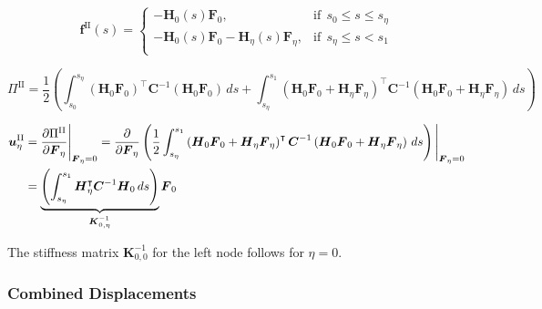 \begin{equation}
\boldsymbol{f}^{\mathrm{II}}(s) = \begin{cases}
-\boldsymbol{H}_{0}(s)\boldsymbol{F}_0, & \text{if}\ \ s_0 \le s \le s_\eta \\
-\boldsymbol{H}_{0}(s)\boldsymbol{F}_0 - \boldsymbol{H}_{\eta}(s)\boldsymbol{F}_\eta, & \text{if}\ \ s_\eta \le s < s_1 \\
\end{cases}
\end{equation}

\begin{equation}
\Pi^{\mathrm{II}} = \frac{1}{2}\left(\int_{s_0}^{s_\eta} \left(\boldsymbol{H}_{0}\boldsymbol{F}_0\right)^\intercal\boldsymbol{C}^{-1}\left(\boldsymbol{H}_{0}\boldsymbol{F}_0\right)\,ds + \int_{s_\eta}^{s_1} \left(\boldsymbol{H}_{0}\boldsymbol{F}_0 + \boldsymbol{H}_{\eta}\boldsymbol{F}_\eta\right)^\intercal\boldsymbol{C}^{-1}\left(\boldsymbol{H}_{0}\boldsymbol{F}_0 + \boldsymbol{H}_{\eta}\boldsymbol{F}_\eta\right)\,ds\right)
\end{equation}

\begin{align}
\boldsymbol{u}^{\mathrm{II}}_\eta &= \frac{\partial \Pi^{\mathrm{II}}}{\partial \boldsymbol{F}_\eta}\Bigg|_{\boldsymbol{F}_\eta = 0} = \frac{\partial}{\partial \boldsymbol{F}_\eta}\left(\frac{1}{2}\int_{s_\eta}^{s_1} \left(\boldsymbol{H}_{0}\boldsymbol{F}_0 + \boldsymbol{H}_{\eta}\boldsymbol{F}_\eta\right)^\intercal\boldsymbol{C}^{-1}\left(\boldsymbol{H}_{0}\boldsymbol{F}_0 + \boldsymbol{H}_{\eta}\boldsymbol{F}_\eta\right)\,ds\right)\Bigg|_{\boldsymbol{F}_\eta = 0} \notag \\
&= \underbrace{\left(\int_{s_\eta}^{s_1} \boldsymbol{H}_\eta^\intercal\boldsymbol{C}^{-1}\boldsymbol{H}_0\,ds\right)}_{\boldsymbol{K}^{-1}_{0,\eta}}\boldsymbol{F}_0
\end{align}

The stiffness matrix $\boldsymbol{K}^{-1}_{0,0}$ for the left node follows for $\eta = 0$.

%

\subsubsection*{Combined Displacements}

